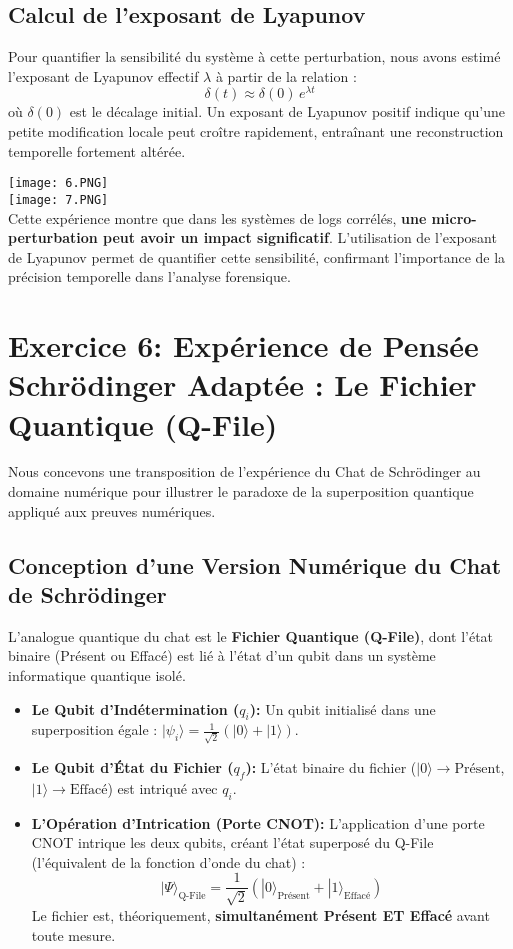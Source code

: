 \documentclass[12pt,a4paper]{report}
\begin{document}
\subsection*{Calcul de l'exposant de Lyapunov}
Pour quantifier la sensibilité du système à cette perturbation, nous avons estimé l'exposant de Lyapunov effectif $\lambda$ à partir de la relation :
\[
\delta(t) \approx \delta(0) \, e^{\lambda t}
\]
où $\delta(0)$ est le décalage initial. Un exposant de Lyapunov positif indique qu'une petite modification locale peut croître rapidement, entraînant une reconstruction temporelle fortement altérée.

	\texttt{[image: 6.PNG]}\\

	\texttt{[image: 7.PNG]}\\


Cette expérience montre que dans les systèmes de logs corrélés, \textbf{une micro-perturbation peut avoir un impact significatif}. L'utilisation de l'exposant de Lyapunov permet de quantifier cette sensibilité, confirmant l'importance de la précision temporelle dans l'analyse forensique.

\section*{Exercice 6: Expérience de Pensée Schrödinger Adaptée : Le Fichier Quantique (Q-File)}

Nous concevons une transposition de l'expérience du Chat de Schrödinger au domaine numérique pour illustrer le paradoxe de la superposition quantique appliqué aux preuves numériques.

\subsection*{Conception d'une Version Numérique du Chat de Schrödinger}

L'analogue quantique du chat est le \textbf{Fichier Quantique (Q-File)}, dont l'état binaire (Présent ou Effacé) est lié à l'état d'un qubit dans un système informatique quantique isolé.

\begin{itemize}
	\item \textbf{Le Qubit d'Indétermination ($q_i$):} Un qubit initialisé dans une superposition égale : $|\psi_{i}\rangle = \frac{1}{\sqrt{2}}(|0\rangle + |1\rangle)$.
	\item \textbf{Le Qubit d'État du Fichier ($q_f$):} L'état binaire du fichier ($|0\rangle \rightarrow \text{Présent}$, $|1\rangle \rightarrow \text{Effacé}$) est intriqué avec $q_i$.
	\item \textbf{L'Opération d'Intrication (Porte CNOT):} L'application d'une porte CNOT intrique les deux qubits, créant l'état superposé du Q-File (l'équivalent de la fonction d'onde du chat) :
	$$|\Psi\rangle_{\text{Q-File}} = \frac{1}{\sqrt{2}}(|0\rangle_{\text{Présent}} + |1\rangle_{\text{Effacé}})$$
	Le fichier est, théoriquement, \textbf{simultanément Présent ET Effacé} avant toute mesure.
\end{itemize}
\end{document}
